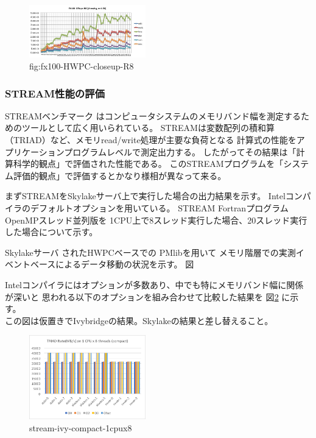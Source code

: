 \documentclass[submit,techrep,noauthor]{ipsj}
\begin{document}
\begin{figure}[tb]
\centering\includegraphics[width=0.45\textwidth]{figs/fx100-HWPC-closeup-R8}
\caption{fig:fx100-HWPC-closeup-R8}
\label{fig:fx100-HWPC-closeup-R8}
\end{figure}




\subsubsection{STREAM性能の評価}
STREAMベンチマーク\cite{stream:1995}
はコンピュータシステムのメモリバンド幅を測定するためのツールとして広く用いられている。
STREAMは変数配列の積和算（TRIAD）など、メモリread/write処理が主要な負荷となる
計算式の性能をアプリケーションプログラムレベルで測定出力する。
したがってその結果は「計算科学的観点」で評価された性能である。
このSTREAMプログラムを「システム評価的観点」で評価するとかなり様相が異なって来る。

まずSTREAMをSkylakeサーバ上で実行した場合の出力結果を示す。
Intelコンパイラのデフォルトオプションを用いている。
STREAM FortranプログラムOpenMPスレッド並列版を
1CPU上で8スレッド実行した場合、20スレッド実行した場合について示す。


Skylakeサーバ
されたHWPCベースでの
PMlibを用いて
メモリ階層での実測イベントベースによるデータ移動の状況を示す。
図



Intelコンパイラにはオプションが多数あり、中でも特にメモリバンド幅に関係が深いと
思われる以下のオプションを組み合わせて比較した結果を
図\ref{fig:stream-ivy-compact-1cpux8} に示す。\\
{\color{blue}この図は仮置きでIvybridgeの結果。Skylakeの結果と差し替えること。}

\begin{figure}[tb]
\centering\includegraphics[width=0.45\textwidth]{figs/stream-ivy-compact-1cpux8.png}
\caption{stream-ivy-compact-1cpux8}
\label{fig:stream-ivy-compact-1cpux8}
\end{figure}
\end{document}
